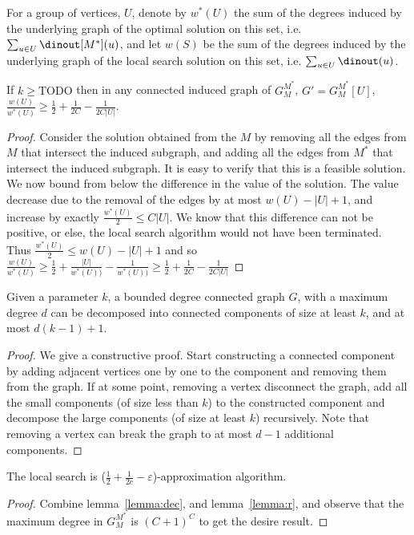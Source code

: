 For a group of vertices, $U$, denote by $w^*(U)$ the sum of the degrees 
induced by the underlying graph of the optimal solution on this set, i.e.
$\sum_{u \in U} \dinout[M^*](u)$, 
and let $w(S)$ be the sum of the degrees 
induced by the underlying graph of the local search solution on this set, i.e.
$\sum_{u \in U} \dinout(u)$.

\begin{lemma}
\label{lemma:r}
If $k \geq \text{TODO}$ then in any connected induced graph of $G^{M^*}_M$, 
$G'= G^{M^*}_M[U]$, 
$
\frac{w(U)}{w^*(U)} 
\geq \frac{1}{2} + \frac{1}{2C} - \frac{1}{2C|U|}
$.
\end{lemma}

\begin{proof}
Consider the solution obtained from the $M$ by removing all the edges from $M$
that intersect the induced subgraph, and adding all the edges from $M^*$ that
intersect the induced subgraph.
It is easy to verify that this is a feasible solution.
We now bound from below the difference in the value of the solution.
The value decrease due to the removal of the edges by at most $w(U) - |U| + 1$,
and increase by exactly $\frac{w^*(U)}{2} \leq C |U|$.
We know that this difference can not be positive, or else, the local search
algorithm would not have been terminated.
Thus 
$\frac{w^*(U)}{2} \leq w(U) - |U| + 1$ 
and so
$
\frac{w(U)}{w^*(U)} 
\geq 
\frac{1}{2} + \frac{|U|}{w^*(U))} - \frac{1}{w^*(U))}  
\geq
\frac{1}{2} + \frac{1}{2C} - \frac{1}{2C|U|}
$
\end{proof}


\begin{lemma}
\label{lemma:dec}
Given a parameter $k$, a bounded degree connected graph $G$, with a maximum
degree $d$ can be decomposed into connected components of size at least $k$, and at most
$d(k-1) + 1$.
\end{lemma}

\begin{proof}
We give a constructive proof.
Start constructing a connected component by adding adjacent vertices
one by one to the component and removing them from the graph.
If at some point, removing a vertex disconnect the graph, add all the small
components (of size less than $k$) to the constructed component and decompose
the large components (of size at least $k$) recursively.
Note that removing a vertex can break the graph to at most $d - 1$ additional
components.
\end{proof}

\begin{theorem}
The local search is ($\frac{1}{2} + \frac{1}{2c} - \varepsilon$)-approximation
algorithm.
\end{theorem}

\begin{proof}
Combine lemma~\ref{lemma:dec}, and lemma~\ref{lemma:r}, 
and observe that the maximum degree in $G^{M^*}_M$ is $(C + 1)^C$ to
get the desire result.
\end{proof}



